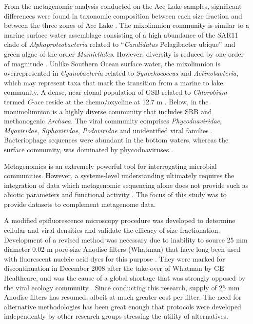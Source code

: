 From the metagenomic analysis conducted on the Ace Lake samples, significant differences were found in taxonomic composition between each size fraction and between the three zones of Ace Lake \cite{Lauro2011}.
The mixolimnion community is similar to a marine surface water assemblage consisting of a high abundance of the SAR11 clade of \emph{Alphaproteobacteria} related to ``\emph{Candidatus} Pelagibacter ubique'' and green algae of the order \emph{Mamiellales}.
However, diversity is reduced by one order of magnitude \cite{Lauro2011}.
Unlike Southern Ocean surface water, the mixolimnion is overrepresented in \emph{Cyanobacteria} related to \emph{Synechococcus} and \emph{Actinobacteria}, which may represent taxa that mark the transition from a marine to lake community.
A dense, near-clonal population of \ac{GSB} related to \emph{Chlorobium} termed \emph{C}-ace reside at the chemo/oxycline at 12.7 m \cite{Ng2010a, Lauro2011}.
Below, in the monimolimnion is a highly diverse community that includes \ac{SRB} and methanogenic \emph{Archaea}.
The viral community comprises \emph{Phycodnaviridae}, \emph{Myoviridae}, \emph{Siphoviridae}, \emph{Podoviridae} and unidentified viral families \cite{Lauro2011}. 
Bacteriophage sequences were abundant in the bottom waters, whereas the surface community, was dominated by phycodnaviruses \cite{Lauro2011}. 

Metagenomics is an extremely powerful tool for interrogating microbial communities.
However, a systems-level understanding ultimately requires the integration of data which metagenomic sequencing alone does not provide such as abiotic parameters and functional activity \cite{Handelsman2008, Warnecke2007}.
The focus of this study was to provide datasets to complement metagenome data.

A modified epifluorescence microscopy procedure was developed to determine cellular and viral densities and validate the efficacy of size-fractionation.
Development of a revised method was necessary due to inability to source 25 mm diameter 0.02 \textmu{}m pore-size Anodisc filters (Whatman) that have long been used with fluorescent nucleic acid dyes for this purpose \cite{Hennes1995, Noble1998, Patel2007}. 
They were marked for discontinuation in December 2008 after the take-over of Whatman by \textsc{GE} Healthcare, and was the cause of a global shortage that was strongly opposed by the viral ecology community \cite{Torrice2009}.
Since conducting this research, supply of 25 mm Anodisc filters has resumed, albeit at much greater cost per filter. 
The need for alternative methodologies has been great enough that protocols were developed independently by other research groups \cite{Budinoff2011, Diemer2012} stressing the utility of alternatives.

